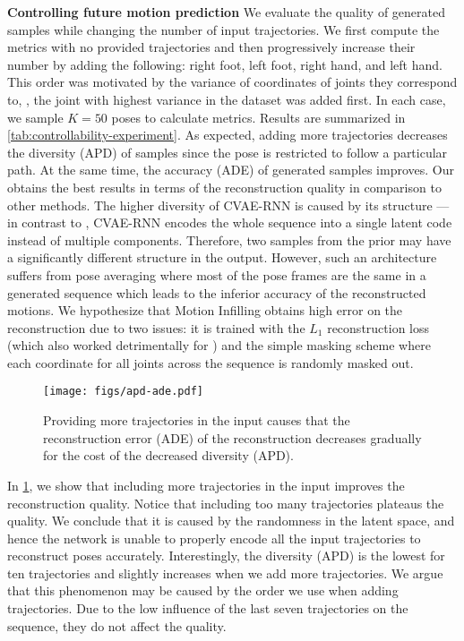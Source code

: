 \documentclass[10pt,twocolumn,letterpaper]{article}
\renewcommand{\paragraph}[1]{\noindent\textbf{#1}\enskip}
\begin{document}
\paragraph{Controlling future motion prediction}
We evaluate the quality of generated samples while changing the number of input trajectories. We first compute the metrics with no provided trajectories and then progressively increase their number by adding the following: right foot, left foot, right hand, and left hand. This order was motivated by the variance of coordinates of joints they correspond to, \ie, the joint with highest variance in the dataset was added first. 
In each case, we sample $K = 50$ poses to calculate metrics. Results are summarized in \cref{tab:controllability-experiment}. As expected, adding more trajectories decreases the diversity (APD) of samples since the pose is restricted to follow a particular path. At the same time, the accuracy (ADE) of generated samples improves. Our \trajevae{} obtains the best results in terms of the reconstruction quality in comparison to other methods. The higher diversity of CVAE-RNN is caused by its structure --- in contrast to \trajevae{}, CVAE-RNN encodes the whole sequence into a single latent code instead of multiple components. Therefore, two samples from the prior may have a significantly different structure in the output. However, such an architecture suffers from pose averaging where most of the pose frames are the same in a generated sequence \cite{fragkiadaki2015recurrent, li2017auto} which leads to the inferior accuracy of the reconstructed motions. We hypothesize that Motion Infilling \cite{kaufmann2020convolutional} obtains high error on the reconstruction due to two issues: it is trained with the $L_1$ reconstruction loss (which also worked detrimentally for \trajevae{}) and the simple masking scheme where each coordinate for all joints across the sequence is randomly masked out. 

\begin{figure}
    \centering
    \texttt{[image: figs/apd-ade.pdf]}
    \caption{Providing more trajectories in the input causes that the reconstruction error (ADE) of the reconstruction decreases gradually for the cost of the decreased diversity (APD).}
    \label{fig:apd-vs-ade-trajectories}
\end{figure}

In \cref{fig:apd-vs-ade-trajectories}, we show that including more trajectories in the input improves the reconstruction quality. Notice that including too many trajectories plateaus the quality. We conclude that it is caused by the randomness in the latent space, and hence the network is unable to properly encode all the input trajectories to reconstruct poses accurately. Interestingly, the diversity (APD) is the lowest for ten trajectories and slightly increases when we add more trajectories. We argue that this phenomenon may be caused by the order we use when adding trajectories. Due to the low influence of the last seven trajectories on the sequence, they do not affect the quality.
\end{document}
